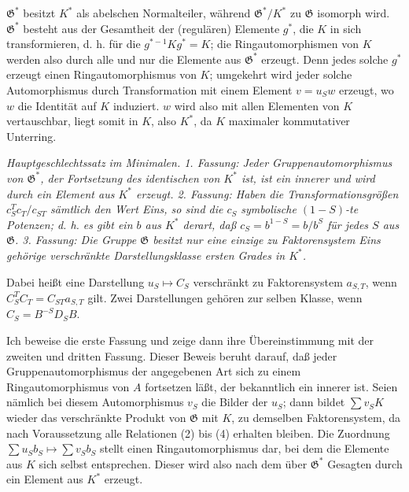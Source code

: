 \(\mathfrak G^*\) besitzt \(K^*\) als abelschen Normalteiler, während \(\mathfrak G^*/K^*\) zu \(\mathfrak G\) isomorph wird. \(\mathfrak G^*\) besteht aus der Gesamtheit der (regulären) Elemente \(g^*\), die \(K\) in sich transformieren, d. h. für die \(g^{*-1}Kg^*=K\); die Ringautomorphismen von \(K\) werden also durch alle und nur die Elemente aus \(\mathfrak G^*\) erzeugt. Denn jedes solche \(g^*\) erzeugt einen Ringautomorphismus von \(K\); umgekehrt wird jeder solche Automorphismus durch Transformation mit einem Element \(v=u_Sw\) erzeugt, wo \(w\) die Identität auf \(K\) induziert. \(w\) wird also mit allen Elementen von \(K\) vertauschbar, liegt somit in \(K\), also \(K^*\), da \(K\) maximaler kommutativer Unterring.

\emph{Hauptgeschlechtssatz im Minimalen. 1. Fassung: Jeder Gruppenautomorphismus von \(\mathfrak G^*\), der Fortsetzung des identischen von \(K^*\) ist, ist ein innerer und wird durch ein Element aus \(K^*\) erzeugt. 2. Fassung: Haben die Transformationsgrößen \(c_S^Tc_T/c_{ST}\) sämtlich den Wert Eins, so sind die \(c_S\) symbolische \((1-S)\)-te Potenzen; d. h. es gibt ein \(b\) aus \(K^*\) derart, daß \(c_S=b^{1-S}=b/b^S\) für jedes \(S\) aus \(\mathfrak G\). 3. Fassung: Die Gruppe \(\mathfrak G\) besitzt nur eine einzige zu Faktorensystem Eins gehörige verschränkte Darstellungsklasse ersten Grades in \(K^*\).}

Dabei heißt eine Darstellung \(u_S\mapsto C_S\) verschränkt zu Faktorensystem \(a_{S,T}\), wenn \(C_S^TC_T=C_{ST}a_{S,T}\) gilt. Zwei Darstellungen gehören zur selben Klasse, wenn \(C_S=B^{-S}D_SB\).

Ich beweise die erste Fassung und zeige dann ihre Übereinstimmung mit der zweiten und dritten Fassung. Dieser Beweis beruht darauf, daß jeder Gruppenautomorphismus der angegebenen Art sich zu einem Ringautomorphismus von \(A\) fortsetzen läßt, der bekanntlich ein innerer ist. Seien nämlich bei diesem Automorphismus \(v_S\) die Bilder der \(u_S\); dann bildet \(\sum v_SK\) wieder das verschränkte Produkt von \(\mathfrak G\) mit \(K\), zu demselben Faktorensystem, da nach Voraussetzung alle Relationen (2) bis (4) erhalten bleiben. Die Zuordnung \(\sum u_Sb_S\mapsto\sum v_Sb_S\) stellt einen Ringautomorphismus dar, bei dem die Elemente aus \(K\) sich selbst entsprechen. Dieser wird also nach dem über \(\mathfrak G^*\) Gesagten durch ein Element aus \(K^*\) erzeugt.

